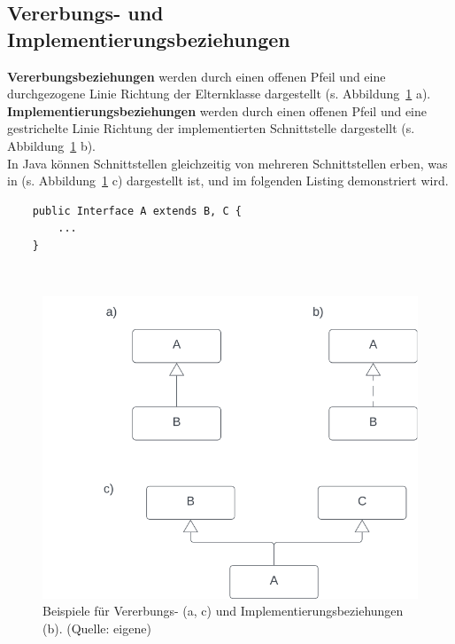 \subsection{Vererbungs- und Implementierungsbeziehungen}

\textbf{Vererbungsbeziehungen} werden durch einen offenen Pfeil und eine durchgezogene Linie Richtung der Elternklasse dargestellt (s. Abbildung~\ref{fig:inheritance} a).\\

\textbf{Implementierungsbeziehungen} werden durch einen offenen Pfeil und eine gestrichelte Linie Richtung der implementierten Schnittstelle dargestellt (s. Abbildung~\ref{fig:inheritance} b).\\

In Java können Schnittstellen gleichzeitig von mehreren Schnittstellen erben, was in (s. Abbildung~\ref{fig:inheritance} c) dargestellt ist, und im folgenden Listing demonstriert wird.\\

\begin{verbatim}
    public Interface A extends B, C {
        ...
    }
\end{verbatim}\\

\begin{figure}
    \centering
    \includegraphics[scale=0.5]{chapters/fopt3/img/inheritance}
    \caption{Beispiele für Vererbungs- (a, c) und Implementierungsbeziehungen (b). (Quelle: eigene)}
    \label{fig:inheritance}
\end{figure}

